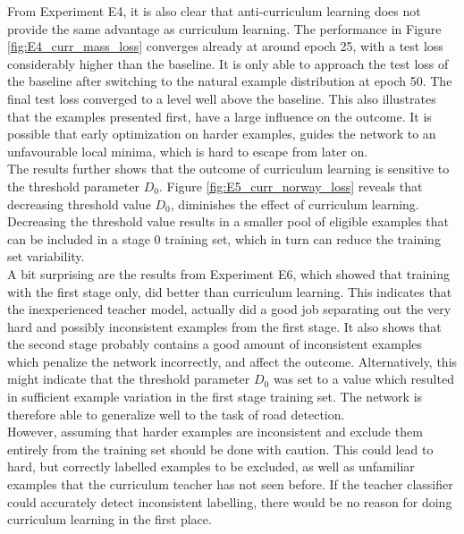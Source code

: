 From Experiment E4, it is also clear that anti-curriculum learning does not provide the same advantage as curriculum learning. The performance in Figure \ref{fig:E4_curr_mass_loss} converges already at around epoch 25, with a test loss considerably higher than the baseline. It is only able to approach the test loss of the baseline after switching to the natural example distribution at epoch 50. The final test loss converged to a level well above the baseline. This also illustrates that the examples presented first, have a large influence on the outcome. It is possible that early optimization on harder examples, guides the network to an unfavourable local minima, which is hard to escape from later on.\\

The results further shows that the outcome of curriculum learning is sensitive to the threshold parameter $D_0$. Figure \ref{fig:E5_curr_norway_loss} reveals that decreasing threshold value $D_0$, diminishes the effect of curriculum learning. Decreasing the threshold value results in a smaller pool of eligible examples that can be included in a stage 0 training set, which in turn can reduce the training set variability.\\ 

A bit surprising are the results from Experiment E6, which showed that training with the first stage only, did better than curriculum learning. This indicates that the inexperienced teacher model, actually did a good job separating out the very hard and possibly inconsistent examples from the first stage. It also shows that the second stage probably contains a good amount of inconsistent examples which penalize the network incorrectly, and affect the outcome. Alternatively, this might indicate that the threshold parameter $D_0$ was set to a value which resulted in sufficient example variation in the first stage training set. The network is therefore able to generalize well to the task of road detection.\\

However, assuming that harder examples are inconsistent and exclude them entirely from the training set should be done with caution. This could lead to hard, but correctly labelled examples to be excluded, as well as unfamiliar examples that the curriculum teacher has not seen before. If the teacher classifier could accurately detect inconsistent labelling, there would be no reason for doing curriculum learning in the first place.\\ 

